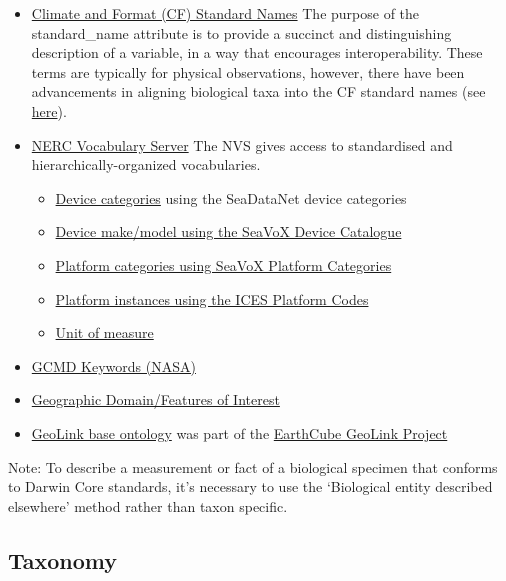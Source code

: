 \documentclass[
]{book}
\begin{document}
\begin{itemize}
\item
  \href{http://cfconventions.org/standard-names.html}{Climate and Format (CF) Standard Names} The purpose of the standard\_name attribute is to provide a succinct and distinguishing description of a variable, in a way that encourages interoperability. These terms are typically for physical observations, however, there have been advancements in aligning biological taxa into the CF standard names (see \href{https://cfconventions.org/Data/cf-conventions/cf-conventions-1.8/cf-conventions.html\#taxon-names-and-identifiers}{here}).
\item
  \href{http://vocab.nerc.ac.uk/}{NERC Vocabulary Server} The NVS gives access to standardised and hierarchically-organized vocabularies.

  \begin{itemize}
  \item
    \href{http://vocab.nerc.ac.uk/collection/L05/current/}{Device categories} using the SeaDataNet device categories
  \item
    \href{http://vocab.nerc.ac.uk/collection/L22/current/}{Device make/model using the SeaVoX Device Catalogue}
  \item
    \href{http://vocab.nerc.ac.uk/collection/L06/current/}{Platform categories using SeaVoX Platform Categories}
  \item
    \href{http://vocab.nerc.ac.uk/collection/C17/current/}{Platform instances using the ICES Platform Codes}
  \item
    \href{http://vocab.nerc.ac.uk/collection/P06/current/}{Unit of measure}
  \end{itemize}
\item
  \href{https://wiki.earthdata.nasa.gov/display/CMR/GCMD+Keyword+Access}{GCMD Keywords (NASA)}
\item
  \href{http://vocab.nerc.ac.uk/collection/C19/current/}{Geographic Domain/Features of Interest}
\item
  \href{http://schema.geolink.org/1.0/base/main.html}{GeoLink base ontology} was part of the \href{http://www.geolink.org/}{EarthCube GeoLink Project}
\end{itemize}

Note: To describe a measurement or fact of a biological specimen that conforms to Darwin Core standards, it's necessary to use the `Biological entity described elsewhere' method rather than taxon specific.

\hypertarget{taxonomy}{%
\subsection{Taxonomy}\label{taxonomy}}
\end{document}
